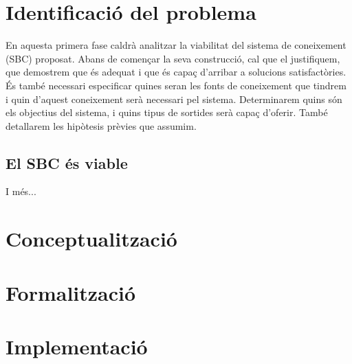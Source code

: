 
\section{Identificació del problema}

En aquesta primera fase caldrà analitzar la viabilitat del sistema de coneixement (SBC) proposat. Abans de començar la seva construcció, cal que el justifiquem, que demostrem que és adequat i que és capaç d'arribar a solucions satisfactòries. És també necessari especificar quines seran les fonts de coneixement que tindrem i quin d'aquest coneixement serà necessari pel sistema. Determinarem quins són els objectius del sistema, i quins tipus de sortides serà capaç d'oferir. També detallarem les hipòtesis prèvies que assumim.

\subsection{El SBC és viable}

I més...

\section{Conceptualització}

\section{Formalització}

\section{Implementació}
